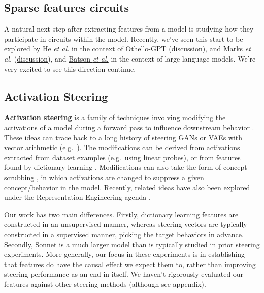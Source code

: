\documentclass{article}
\let\oldsubsection\subsection
\renewcommand{\subsection}{\FloatBarrier\oldsubsection}
\begin{document}
\subsection{Sparse features circuits}\label{sec:related-work-circuits}

\textbf{}

A natural next step after extracting features from a model is studying how they participate in circuits within the model. Recently, we've seen this start to be explored by He \textit{et al.} \cite{he2024dictionary} in the context of Othello-GPT (\href{https://transformer-circuits.pub/2024/march-update/index.html\#external-othello}{discussion}), and Marks \textit{et al.} \cite{marks2024sparse} (\href{https://transformer-circuits.pub/2024/april-update/index.html\#external-sparse-circuits}{discussion}), and \href{https://transformer-circuits.pub/2024/march-update/index.html\#feature-heads}{Batson }\textit{\href{https://transformer-circuits.pub/2024/march-update/index.html\#feature-heads}{et al.}} \cite{batson2024easy} in the context of large language models. We're very excited to see this direction continue.

\subsection{Activation Steering}\label{sec:related-work-steering}

\textbf{Activation steering} is a family of techniques involving modifying the activations of a model during a forward pass to influence downstream behavior \cite{li2023inferencetime,turner2023activation,marks2023geometry,rimsky2024steering}. These ideas can trace back to a long history of steering GANs or VAEs with vector arithmetic (e.g.~\cite{radford2015unsupervised,upchurch2017deep,jahanian2019steerability}). The modifications can be derived from activations extracted from dataset examples (e.g.~using linear probes), or from features found by dictionary learning \cite{tamkin2023codebook,marks2024sparse,conmy2024steering}. Modifications can also take the form of concept scrubbing \cite{belrose2023leace}, in which activations are changed to suppress a given concept/behavior in the model. Recently, related ideas have also been explored under the Representation Engineering agenda \cite{zou2023representation}.

Our work has two main differences. Firstly, dictionary learning features are constructed in an unsupervised manner, whereas steering vectors are typically constructed in a supervised manner, picking the target behaviors in advance. Secondly, Sonnet is a much larger model than is typically studied in prior steering experiments. More generally, our focus in these experiments is in establishing that features do have the causal effect we expect them to, rather than improving steering performance as an end in itself. We haven't rigorously evaluated our features against other steering methods (although see appendix).
\end{document}
